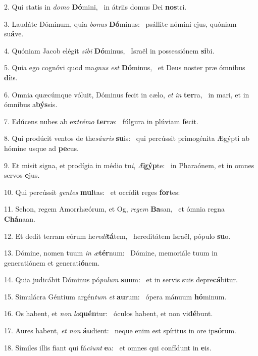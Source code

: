 2. Qui statis in \textit{do}\textit{mo} \textbf{Dó}mini, \ast\  in átriis domus Dei \textbf{nos}tri.\

3. Laudáte Dóminum, quia \textit{bo}\textit{nus} \textbf{Dó}minus: \ast\  psállite nómini ejus, quóniam su\textbf{á}ve.\

4. Quóniam Jacob elégit \textit{si}\textit{bi} \textbf{Dó}minus, \ast\  Israël in possessiónem \textbf{si}bi.\

5. Quia ego cognóvi quod ma\textit{gnus} \textit{est} \textbf{Dó}minus, \ast\  et Deus noster præ ómnibus \textbf{di}is.\

6. Omnia quæcúmque vóluit, Dóminus fecit in cælo, \textit{et} \textit{in} \textbf{ter}ra, \ast\  in mari, et in ómnibus a\textbf{býs}sis.\

7. Edúcens nubes ab ex\textit{tré}\textit{mo} \textbf{ter}ræ: \ast\  fúlgura in plúviam \textbf{fe}cit.\

8. Qui prodúcit ventos de the\textit{sáu}\textit{ris} \textbf{su}is: \ast\  qui percússit primogénita Ægýpti ab hómine usque ad \textbf{pe}cus.\

9. Et misit signa, et prodígia in médio tu\textit{i}, \textit{Æ}\textbf{gýp}te: \ast\  in Pharaónem, et in omnes servos \textbf{e}jus.\

10. Qui percússit \textit{gen}\textit{tes} \textbf{mul}tas: \ast\  et occídit reges \textbf{for}tes:\

11. Sehon, regem Amorrhæórum, et Og, \textit{re}\textit{gem} \textbf{Ba}san, \ast\  et ómnia regna \textbf{Chá}naan.\

12. Et dedit terram eórum he\textit{re}\textit{di}\textbf{tá}tem, \ast\  hereditátem Israël, pópulo \textbf{su}o.\

13. Dómine, nomen tuum \textit{in} \textit{æ}\textbf{tér}num: \ast\  Dómine, memoriále tuum in generatiónem et generati\textbf{ó}nem.\

14. Quia judicábit Dóminus pó\textit{pu}\textit{lum} \textbf{su}um: \ast\  et in servis suis depre\textbf{cá}bitur.\

15. Simulácra Géntium argén\textit{tum} \textit{et} \textbf{au}rum: \ast\  ópera mánuum \textbf{hó}minum.\

16. Os habent, et \textit{non} \textit{lo}\textbf{quén}tur: \ast\  óculos habent, et non vi\textbf{dé}bunt.\

17. Aures habent, \textit{et} \textit{non} \textbf{áu}dient: \ast\  neque enim est spíritus in ore ip\textbf{só}rum.\

18. Símiles illis fiant qui fá\textit{ci}\textit{unt} \textbf{e}a: \ast\  et omnes qui confídunt in \textbf{e}is.\


